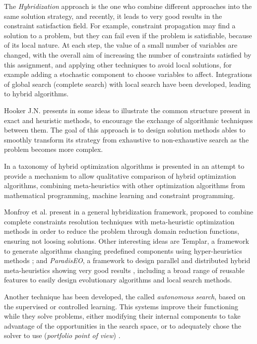 The \textit{Hybridization} approach is the one who combine different approaches into the same solution strategy, and recently, it leads to very good results in the constraint satisfaction field. For example, constraint propagation may find a solution to a problem, but they can fail even if the problem is satisfiable, because of its local nature. At each step, the value of a small number of variables are changed, with the overall aim of increasing the number of constraints satisfied by this assignment, and applying other techniques to avoid local solutions, for example adding a stochastic component to choose variables to affect. Integrations of global search (complete search) with local search have been developed, leading to hybrid algorithms. 

Hooker J.N. presents in \cite{Hooker2012} some ideas to illustrate the common structure present in exact and heuristic methods, to encourage the exchange of algorithmic techniques between them. The goal of this approach is to design solution methods ables to smoothly transform its strategy from exhaustive to non-exhaustive search as the problem becomes more complex.

In \cite{El-Ghazali2013} a taxonomy of hybrid optimization algorithms is presented in an attempt to provide a mechanism to allow qualitative comparison of hybrid optimization algorithms, combining meta-heuristics with other optimization algorithms from mathematical programming, machine learning and constraint programming.

Monfroy et al. present in \cite{Monfroya,Monfroyb} a general hybridization framework, proposed to combine complete constraints resolution techniques with meta-heuristic optimization methods in order to reduce the problem through domain reduction functions, ensuring not loosing solutions. Other interesting ideas are {\sc Templar}, a framework to generate algorithms changing predefined components using hyper-heuristics methods \cite{Swan2015}; and {\it ParadisEO}, a framework to design parallel and distributed hybrid meta-heuristics showing very good results \cite{Cahon2004}, including a broad range of reusable features to easily design evolutionary algorithms and local search methods.

Another technique has been developed, the called {\it autonomous search}, based on the supervised or controlled learning. This systems improve their functioning while they solve problems, either  modifying their internal components to take advantage of the opportunities in the search space, or to adequately chose the solver to use ({\it portfolio point of view}) \cite{WhatIsAuto}.

